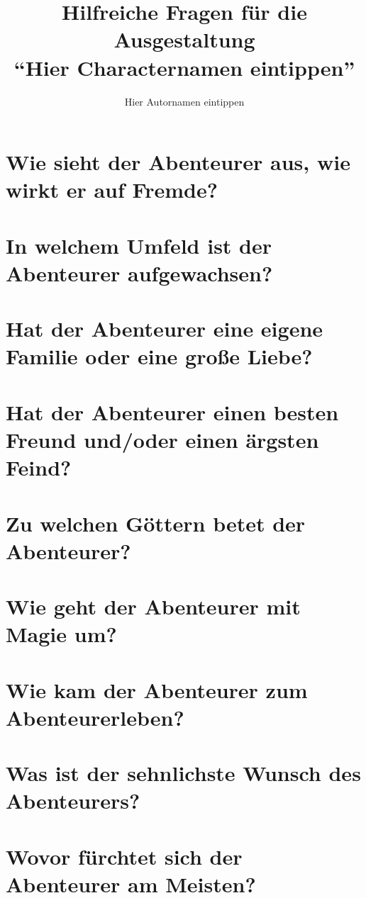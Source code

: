 \documentclass{article}
\author{Hier Autornamen eintippen}
\title{Hilfreiche Fragen für die Ausgestaltung \\ \enquote{Hier Characternamen eintippen} }
\begin{document}
	\maketitle
	
	\tableofcontents
	
	\section[Aussehen]{Wie sieht der Abenteurer aus, wie wirkt er auf Fremde?}
	
	\section[Soziales Umfeld]{In welchem Umfeld ist der Abenteurer aufgewachsen?}
	
	\section[Beziehungsstatus]{Hat der Abenteurer eine eigene Familie oder eine große Liebe?}

	\section[Freund und Feind]{Hat der Abenteurer einen besten Freund und/oder einen ärgsten Feind?}

	\section[Religion]{Zu welchen Göttern betet der Abenteurer?}
	
	\section[Magie]{Wie geht der Abenteurer mit Magie um?}

	\section[Schicksal]{Wie kam der Abenteurer zum Abenteurerleben?}

	\section[Antrieb]{Was ist der sehnlichste Wunsch des Abenteurers?}

	\section[Ängste]{Wovor fürchtet sich der Abenteurer am Meisten?}
\end{document}
